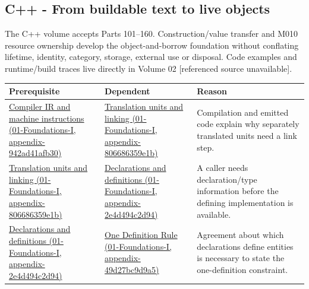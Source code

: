 \subsection{C++ - From buildable text to live objects}\label{appendix-4ad47bdd269a-c---from-buildable-text-to-live-objects}

The C++ volume accepts Parts 101--160. Construction/value transfer and M010 resource ownership develop the object-and-borrow foundation without conflating lifetime, identity, category, storage, external use or disposal. Code examples and runtime/build traces live directly in {Volume 02 {[}referenced source unavailable{]}}.

{\def\LTcaptype{none} %
\begin{longtable}[]{@{}
  >{\raggedright\arraybackslash}p{}
  >{\raggedright\arraybackslash}p{}
  >{\raggedright\arraybackslash}p{}@{}}
\toprule\noalign{}
\begin{minipage}[b]{\linewidth}\raggedright
Prerequisite
\end{minipage} & \begin{minipage}[b]{\linewidth}\raggedright
Dependent
\end{minipage} & \begin{minipage}[b]{\linewidth}\raggedright
Reason
\end{minipage} \\
\midrule\noalign{}
\endhead
\bottomrule\noalign{}
\endlastfoot
\href{../01-Foundations-I/main.pdf\#nameddest=appendix-942ad41afb30}{Compiler IR and machine instructions (01-Foundations-I, appendix-942ad41afb30)} & \href{../01-Foundations-I/main.pdf\#nameddest=appendix-806686359e1b}{Translation units and linking (01-Foundations-I, appendix-806686359e1b)} & Compilation and emitted code explain why separately translated units need a link step. \\
\href{../01-Foundations-I/main.pdf\#nameddest=appendix-806686359e1b}{Translation units and linking (01-Foundations-I, appendix-806686359e1b)} & \href{../01-Foundations-I/main.pdf\#nameddest=appendix-2e4d494c2d94}{Declarations and definitions (01-Foundations-I, appendix-2e4d494c2d94)} & A caller needs declaration/type information before the defining implementation is available. \\
\href{../01-Foundations-I/main.pdf\#nameddest=appendix-2e4d494c2d94}{Declarations and definitions (01-Foundations-I, appendix-2e4d494c2d94)} & \href{../01-Foundations-I/main.pdf\#nameddest=appendix-49d27bc9d9a5}{One Definition Rule (01-Foundations-I, appendix-49d27bc9d9a5)} & Agreement about which declarations define entities is necessary to state the one-definition constraint. \\

\end{longtable}}
